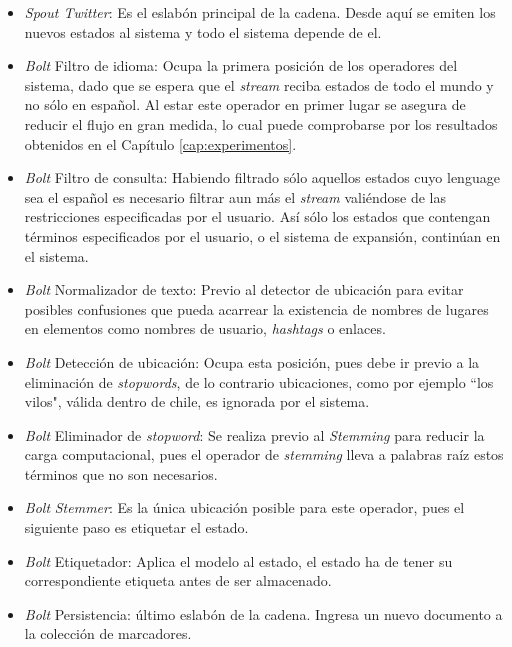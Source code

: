 \begin{itemize}
\item \textit{Spout Twitter}: Es el eslabón principal de la cadena. Desde aquí se emiten los nuevos estados al sistema y todo el sistema depende de el. 
\item \textit{Bolt} Filtro de idioma: Ocupa la primera posición de los operadores del sistema, dado que se espera que el \textit{stream} reciba estados de todo el mundo y no sólo en español. Al estar este operador en primer lugar se asegura de reducir el flujo en gran medida, lo cual puede comprobarse por los resultados obtenidos en el Capítulo \ref{cap:experimentos}.
\item \textit{Bolt} Filtro de consulta: Habiendo filtrado sólo aquellos estados cuyo lenguage sea el español es necesario filtrar aun más el \textit{stream} valiéndose de las restricciones especificadas por el usuario. Así sólo los estados que contengan términos especificados por el usuario, o el sistema de expansión, continúan en el sistema.
\item\textit{Bolt} Normalizador de texto: Previo al detector de ubicación para evitar posibles confusiones que pueda acarrear la existencia de nombres de lugares en elementos como nombres de usuario, \textit{hashtags} o enlaces.
\item\textit{Bolt} Detección de ubicación: Ocupa esta posición, pues debe ir previo a la eliminación de \textit{stopwords}, de lo contrario ubicaciones, como por ejemplo ``los vilos", válida dentro de chile, es ignorada por el sistema.
\item\textit{Bolt} Eliminador de \textit{stopword}: Se realiza previo al \textit{Stemming} para reducir la carga computacional, pues el operador de \textit{stemming} lleva a palabras raíz estos términos que no son necesarios.
\item\textit{Bolt} \textit{Stemmer}: Es la única ubicación posible para este operador, pues el siguiente paso es etiquetar el estado.
\item\textit{Bolt} Etiquetador: Aplica el modelo al estado, el estado ha de tener su correspondiente etiqueta antes de ser almacenado.
\item\textit{Bolt} Persistencia: último eslabón de la cadena. Ingresa un nuevo documento a la colección de marcadores.
\end{itemize}

